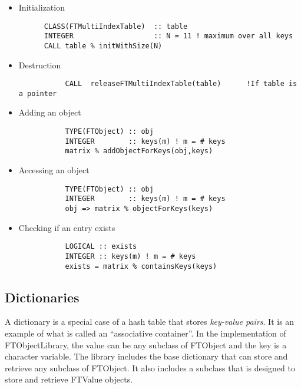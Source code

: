 \documentclass[9pt]{article}
\begin{document}
\begin{itemize}
        \item Initialization
		{\color{blue}\begin{verbatim}
      CLASS(FTMultiIndexTable)  :: table
      INTEGER                   :: N = 11 ! maximum over all keys
      CALL table % initWithSize(N)
	\end{verbatim}}
	
        \item Destruction
		{\color{blue}\begin{verbatim}
           CALL  releaseFTMultiIndexTable(table)      !If table is a pointer
	\end{verbatim}}
	
        \item Adding an object

	{\color{blue}\begin{verbatim}
           TYPE(FTObject) :: obj
           INTEGER        :: keys(m) ! m = # keys
           matrix % addObjectForKeys(obj,keys)
	\end{verbatim}}
	
        \item Accessing an object

	{\color{blue}\begin{verbatim}
           TYPE(FTObject) :: obj
           INTEGER        :: keys(m) ! m = # keys
           obj => matrix % objectForKeys(keys)
	\end{verbatim}}
	
        \item Checking if an entry exists
	{\color{blue}\begin{verbatim}
           LOGICAL :: exists
           INTEGER :: keys(m) ! m = # keys
           exists = matrix % containsKeys(keys)
	\end{verbatim}}
	
\end{itemize}

\subsection{Dictionaries}
A dictionary is a special case of a hash table that stores \emph{key-value pairs}. It is an
example of what is called an ``associative container''. In the implementation of FTObjectLibrary,
the value can be any subclass of FTObject and the key is a character variable. The library
includes the base dictionary that can store and retrieve any subclass of FTObject. It also includes a
subclass that is designed to store and retrieve FTValue objects.
\end{document}
